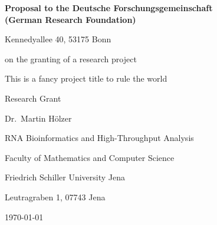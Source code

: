 {

  \vspace*{20ex}

  \begin{center}
  \large

  {\bfseries Proposal to the Deutsche Forschungsgemeinschaft\\(German Research Foundation)}

  Kennedyallee 40, 53175 Bonn

  \vspace{4ex}

  on the granting of a research project

  \vspace{9ex}

  \begin{bfseries}
    This is a fancy project title to rule the world
  \end{bfseries}

  \medskip

	 Research Grant

  \vspace{9ex}

	Dr.\ Martin H\"olzer

 	RNA Bioinformatics and High-Throughput Analysis
  
 	Faculty of Mathematics and Computer Science 

 	Friedrich Schiller University Jena

	Leutragraben 1, 07743 Jena
	 
	\vspace{9ex}

	\today
  \end{center}
}